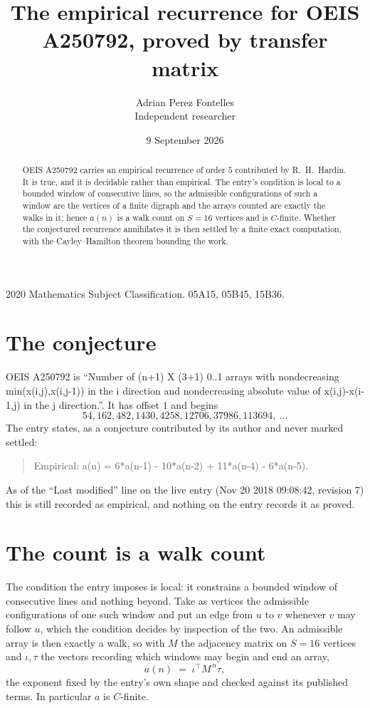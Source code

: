 \documentclass[11pt,a4paper]{article}
\title{The empirical recurrence for OEIS A250792, proved by transfer matrix}
\author{Adrian Perez Fontelles\\ \small Independent researcher}
\date{9 September 2026}
\theoremstyle{plain}
\theoremstyle{definition}
\begin{document}
\maketitle

\begin{abstract}
OEIS A250792 carries an empirical recurrence of order $5$ contributed by R.~H.~Hardin. It is
true, and it is decidable rather than empirical. The entry's condition is local to a bounded window of consecutive lines, so
the admissible configurations of such a window are the vertices of a finite digraph and the
arrays counted are exactly the walks in it; hence $a(n)$ is a walk count on $S=16$ vertices
and is $C$-finite. Whether the conjectured recurrence annihilates it is then settled by a
finite exact computation, with the Cayley--Hamilton theorem bounding the work.
\end{abstract}

\noindent\small 2020 Mathematics Subject Classification. 05A15, 05B45, 15B36.\normalsize

\section{The conjecture}

OEIS A250792 is ``Number of (n+1) X (3+1) 0..1 arrays with nondecreasing min(x(i,j),x(i,j-1)) in the i direction and nondecreasing absolute value of x(i,j)-x(i-1,j) in the j direction.''. It has offset $1$ and begins
\[
54, 162, 482, 1430, 4258, 12706, 37986, 113694,\ \dots
\]
The entry states, as a conjecture contributed by its author and never marked settled:
\begin{quote}
Empirical: a(n) = 6*a(n-1) - 10*a(n-2) + 11*a(n-4) - 6*a(n-5).
\end{quote}
As of the ``Last modified'' line on the live entry (Nov 20 2018 09:08:42, revision 7) this is still
recorded as empirical, and nothing on the entry records it as proved.

\section{The count is a walk count}

The condition the entry imposes is local: it constrains a bounded window of consecutive lines and nothing beyond. Take as
vertices the admissible configurations of one such window and put an edge from $u$ to $v$
whenever $v$ may follow $u$, which the condition decides by inspection of the two. An
admissible array is then exactly a walk, so with $M$ the adjacency matrix on $S=16$ vertices
and $\iota,\tau$ the vectors recording which windows may begin and end an array,
\[
a(n)\;=\;\iota^{\!\top}M^{\,n}\tau ,
\]
the exponent fixed by the entry's own shape and checked against its published terms. In
particular $a$ is $C$-finite.
\end{document}
